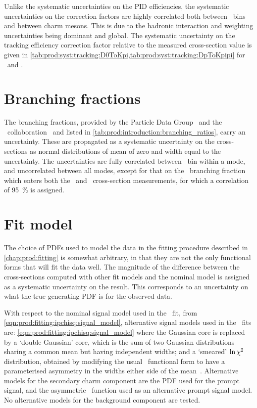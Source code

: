Unlike the systematic uncertainties on the \ac{PID} efficiencies, the 
systematic uncertainties on the correction factors are highly correlated both 
between \pTy\ bins and between charm mesons.
This is due to the hadronic interaction and weighting uncertainties being 
dominant and global.
The systematic uncertainty on the tracking efficiency correction factor 
relative to the measured cross-section value is given in 
\cref{tab:prod:syst:tracking:D0ToKpi,tab:prod:syst:tracking:DpToKpipi} for 
\DzToKpi\ and \DpToKpipi.

\section{Branching fractions}
\label{chap:prod:syst:bf}

The branching fractions, provided by the Particle Data Group~\cite{PDG2014} and 
the \cleo\ collaboration~\cite{Alexander:2008aa} and listed in 
\cref{tab:prod:introduction:branching_ratios}, carry an uncertainty.
These are propagated as a systematic uncertainty on the cross-sections as 
normal distributions of mean of zero and width equal to the uncertainty.
The uncertainties are fully correlated between \pTy\ bin within a mode, and 
uncorrelated between all modes, except for that on the \DzToKpi\ branching 
fraction which enters both the \DzToKpi\ and \DstToDzpi\ cross-section 
measurements, for which a correlation of \SI{95}{\percent} is assigned.

\section{Fit model}
\label{chap:prod:syst:fitting}

The choice of \acp{PDF} used to model the data in the fitting procedure 
described in \cref{chap:prod:fitting} is somewhat arbitrary, in that they are 
not the only functional forms that will fit the data well.
The magnitude of the difference between the cross-sections computed with other 
fit models and the nominal model is assigned as a systematic uncertainty on the 
result.
This corresponds to an uncertainty on what the true generating \ac{PDF} is for 
the observed data.

With respect to the nominal signal model used in the \lnipchisq\ fit, from 
\cref{eqn:prod:fitting:ipchisq:signal_model}, alternative signal models used in 
the \lnipchisq\ fits are: \cref{eqn:prod:fitting:ipchisq:signal_model} where 
the Gaussian core is replaced by a `double Gaussian' core, which is the sum of 
two Gaussian distributions sharing a common mean but having independent widths; 
and a `smeared' $\ln{\ensuremath{\chi^2}}$ distribution, obtained by modifying the usual 
\chisq\ functional form to have a parameterised asymmetry in the widths either 
side of the mean~\cite{LHCb-CONF-2016-010}.
Alternative models for the secondary charm component are the \ac{PDF} used for 
the prompt signal, and the asymmetric \chisq\ function used as an alternative 
prompt signal model.
No alternative models for the background component are tested.


